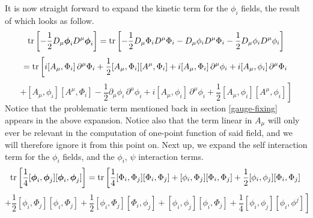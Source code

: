 %
%
It is now straight forward to expand the kinetic term for the $\phi_i$ fields, the result of which looks as follow.
%
%
\begin{equation*}
\tr \left[ -\frac{1}{2} D_\mu \boldsymbol{\phi}_i D^\mu \boldsymbol{\phi}_i \right]
%
=
%
\tr \left[
- \frac{1}{2} D_\mu \Phi_i D^\mu \Phi_i
- D_\mu \phi_i D^\mu \Phi_i
-\frac{1}{2} D_\mu \phi_i D^\mu \phi_i
\right]
\end{equation*}
%
%
\begin{equation*}
=
\tr \left[
i [A_\mu, \Phi_i] \, \partial^\mu \Phi_i
+ \frac{1}{2} [A_\mu, \Phi_i] [ A^\mu, \Phi_i]
+ i [A_\mu, \Phi_i] \, \partial^\mu \phi_i
+ i [A_\mu, \phi_i] \, \partial^\mu \Phi_i
\right.
\end{equation*}
%
%
\begin{equation}
\left.
+ [A_\mu, \phi_i] [A^\mu, \Phi_i]
- \frac{1}{2} \partial_\mu \phi_i \, \partial^\mu \phi_i
+ i [A_\mu, \phi_i] \, \partial^\mu \phi_i
+ \frac{1}{2} [A_\mu, \phi_i] [A^\mu, \phi_i]
\right]
\end{equation}
%
%
Notice that the problematic term mentioned back in section \ref{gauge-fixing} appears in the above expansion. Notice also that the term linear in $A_\mu$ will only ever be relevant in the computation of one-point function of said field, and we will therefore ignore it from this point on. Next up, we expand the self interaction term for the $\phi_i$ fields, and the $\phi_i$, $\psi$ interaction terms.
%
%
\begin{equation*}
\tr \left[
\frac{1}{4} [\boldsymbol{\phi}_i, \boldsymbol{\phi}_j][\boldsymbol{\phi}_i, \boldsymbol{\phi}_j]
\right]
=
\tr \left[
\frac{1}{4} [\Phi_i, \Phi_j][\Phi_i, \Phi_j]
+ [\phi_i, \Phi_j][\Phi_i, \Phi_j]
+ \frac{1}{2} [\phi_i, \phi_j][\Phi_i, \Phi_j]
\right.
\end{equation*}
%
%
\begin{equation}
\left.
+ \frac{1}{2} [\phi_i, \Phi_j][\phi_i, \Phi_j]
+ \frac{1}{2} [\phi_i, \Phi_j][\Phi_i, \phi_j]
+ [\phi_i, \phi_j][\phi_i, \Phi_j]
+ \frac{1}{4} [\phi_i, \phi_j][\phi_i, \phi^j]
\right]
\end{equation}
%
%

